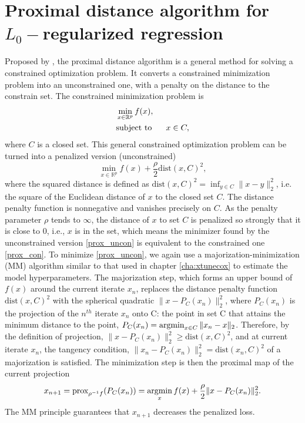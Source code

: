 \section[Proximal distance algorithm for \texorpdfstring{$L_0-$}{Lg}regularized regression]{Proximal distance algorithm for \texorpdfstring{$L_0-$}{Lg}regularized regression}
Proposed by \cite{keys2019proximal}, the proximal distance algorithm is a general method for solving a constrained optimization problem. It converts a constrained minimization problem into an unconstrained one, with a penalty on the distance to the constrain set. The constrained minimization problem is 
\begin{equation} \label{prox_con}
\begin{aligned}
    & \min_{x\in \mathbb{R}^p} f(x), \\
    & \text{subject to} \hspace{0.6cm} x\in C, 
\end{aligned}
\end{equation}
where $C$ is a closed set. This general constrained optimization problem can be turned into a penalized version (unconstrained)
\begin{equation} \label{prox_uncon}
   \min_{x\in \mathbb{R}^p} f(x)+\frac{\rho}{2}\text{dist}(x,C)^2,
\end{equation}
where the squared distance is defined as $\text{dist}(x,C)^2=\inf_{y\in C}\|x-y\|_2^2$, i.e. the square of the Euclidean distance of $x$ to the closed set $C$. The distance penalty function is nonnegative and vanishes precisely on $C$. As the penalty parameter $\rho$ tends to $\infty$, the distance of $x$ to set $C$ is penalized so strongly that it is close to 0, i.e., $x$ is in the set, which means the minimizer found by the unconstrained version \eqref{prox_uncon} is equivalent to the constrained one \eqref{prox_con}. To minimize \eqref{prox_uncon}, we again use a majorization-minimization (MM) algorithm similar to that used in chapter \ref{cha:xtunecox} to estimate the model hyperparameters. The majorization step, which forms an upper bound of $f(x)$ around the current iterate $x_n$, replaces the distance penalty function $\text{dist}(x,C)^2$ with the spherical quadratic $\|x-P_C(x_n)\|_2^2$, where $P_C(x_n)$ is the projection of the $n^{th}$ iterate $x_n$ onto C: the point in set C that attains the minimum distance to the point, $P_C(x_n)=\operatorname*{argmin}_{x\in C}\|x_n-x\|_2$. Therefore, by the definition of projection, $\|x-P_C(x_n)\|_2^2\geq\text{dist}(x,C)^2$, and at current iterate $x_n$, the tangency condition, $\|x_n-P_C(x_n)\|_2^2=\text{dist}(x_n,C)^2$ of a majorization is satisfied. The minimization step is then the proximal map of the current projection
\begin{equation}
    x_{n+1}=\text{prox}_{\rho^{-1}f}(P_C(x_n))=\operatorname*{argmin}_x f(x)+\frac{\rho}{2}\|x-P_C(x_n)\|_2^2.
\end{equation}
The MM principle guarantees that $x_{n+1}$ decreases the penalized loss.

